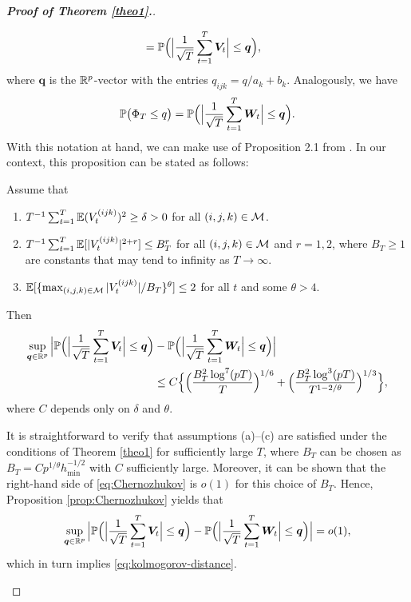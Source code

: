 \documentclass[a4paper,12pt]{article}
\numberwithin{equation}{section}
\begin{document}
\begin{proof}[\textnormal{\textbf{Proof of Theorem \ref{theo1}.}}]
\begin{enumerate}[label=\textit{Step \arabic*.}, leftmargin=0cm, itemindent=1.45cm]
\begin{align*}
 & = \mathbb{P} \Big( \Big|\frac{1}{\sqrt{T}} \sum_{t=1}^T \boldsymbol{V}_t\Big| \le \boldsymbol{q} \Big),
\end{align*} 
where $\boldsymbol{q}$ is the $\mathbb{R}^p$-vector with the entries $q_{ijk} = q/a_k + b_k$. Analogously, we have  
\[ \mathbb{P} \big( \Phi_T \le q \big) = \mathbb{P} \Big( \Big|\frac{1}{\sqrt{T}} \sum_{t=1}^T \boldsymbol{W}_t\Big| \le \boldsymbol{q} \Big). \]
With this notation at hand, we can make use of Proposition 2.1 from \cite{Chernozhukov2017}. In our context, this proposition can be stated as follows: 
\begin{propA}\label{prop:Chernozhukov}
Assume that 
\begin{enumerate}[label=(\alph*),leftmargin=0.7cm]
\item $T^{-1} \sum_{t=1}^T \mathbb{E} (V^{(ijk)}_t)^2 \ge \delta > 0$ for all $(i,j,k) \in \mathcal{M}$.
\item $T^{-1} \sum_{t=1}^T \mathbb{E}[ |V^{(ijk)}_t|^{2+r} ] \le B_T^r$ for all $(i,j,k) \in \mathcal{M}$ and $r=1,2$, where $B_T \ge 1$ are constants that may tend to infinity as $T \rightarrow \infty$.  
\item $\mathbb{E}[ \{ \max_{(i,j,k) \in \mathcal{M}} |V^{(ijk)}_t| / B_T \}^\theta ] \le 2$ for all $t$ and some $\theta > 4$.  
\end{enumerate}
Then  
\begin{align}
\sup_{\boldsymbol{q} \in \mathbb{R}^p} \Big| \mathbb{P} \Big( \Big|\frac{1}{\sqrt{T}} \sum_{t=1}^T \boldsymbol{V}_t\Big| \le \boldsymbol{q} \Big) & - \mathbb{P} \Big( \Big|\frac{1}{\sqrt{T}} \sum_{t=1}^T \boldsymbol{W}_t\Big| \le \boldsymbol{q} \Big) \Big| \nonumber \\ & \le C \Big\{ \Big( \frac{B_T^2 \log^7(pT)}{T} \Big)^{1/6} + \Big( \frac{B_T^2 \log^3(pT)}{T^{1-2/\theta}} \Big)^{1/3} \Big\}, \label{eq:Chernozhukov}
\end{align}
where $C$ depends only on $\delta$ and $\theta$. 
\end{propA}
It is straightforward to verify that assumptions (a)--(c) are satisfied under the conditions of Theorem \ref{theo1} for sufficiently large $T$, where $B_T$ can be chosen as $B_T = C p^{1/\theta} h_{\min}^{-1/2}$ with $C$ sufficiently large. Moreover, it can be shown that the right-hand side of \eqref{eq:Chernozhukov} is $o(1)$ for this choice of $B_T$. Hence, Proposition \ref{prop:Chernozhukov} yields that 
\[ \sup_{\boldsymbol{q} \in \mathbb{R}^p} \Big| \mathbb{P} \Big( \Big|\frac{1}{\sqrt{T}} \sum_{t=1}^T \boldsymbol{V}_t\Big| \le \boldsymbol{q} \Big) - \mathbb{P} \Big( \Big|\frac{1}{\sqrt{T}} \sum_{t=1}^T \boldsymbol{W}_t\Big| \le \boldsymbol{q} \Big) \Big| = o(1), \]
which in turn implies \eqref{eq:kolmogorov-distance}. 



\end{enumerate}
\end{proof}
\end{document}
